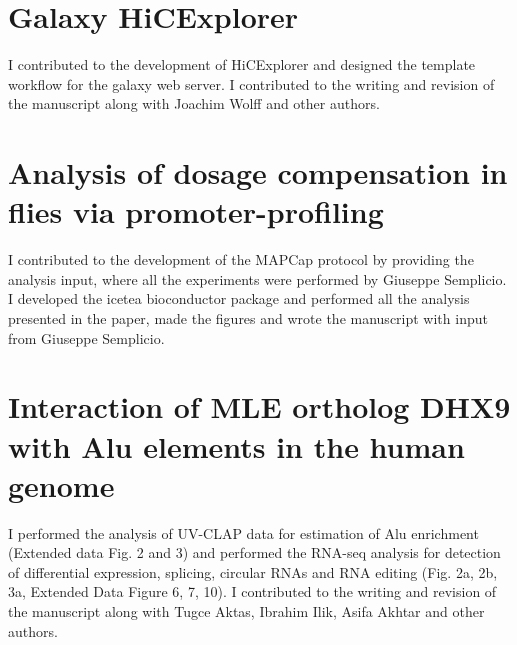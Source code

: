 \documentclass[11pt,twoside]{MPIthesis}
\theoremstyle{definition}
\theoremstyle{definition}
\theoremstyle{definition}
\theoremstyle{remark}
\begin{document}




\section{Galaxy HiCExplorer}\label{galaxy-hicexplorer}

I contributed to the development of HiCExplorer and designed the
template workflow for the galaxy web server. I contributed to the
writing and revision of the manuscript along with Joachim Wolff and
other authors.



\section{Analysis of dosage compensation in flies via
promoter-profiling}\label{analysis-of-dosage-compensation-in-flies-via-promoter-profiling}

I contributed to the development of the MAPCap protocol by providing the
analysis input, where all the experiments were performed by Giuseppe
Semplicio. I developed the icetea bioconductor package and performed all
the analysis presented in the paper, made the figures and wrote the
manuscript with input from Giuseppe Semplicio.



\section{Interaction of MLE ortholog DHX9 with Alu elements in the human
genome}\label{interaction-of-mle-ortholog-dhx9-with-alu-elements-in-the-human-genome}

I performed the analysis of UV-CLAP data for estimation of Alu
enrichment (Extended data Fig. 2 and 3) and performed the RNA-seq
analysis for detection of differential expression, splicing, circular
RNAs and RNA editing (Fig. 2a, 2b, 3a, Extended Data Figure 6, 7, 10). I
contributed to the writing and revision of the manuscript along with
Tugce Aktas, Ibrahim Ilik, Asifa Akhtar and other authors.


\end{document}
